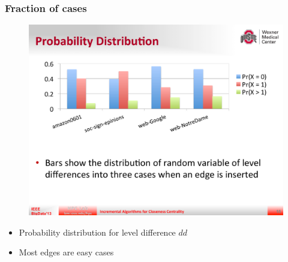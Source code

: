 \begin{frame}
  \frametitle{Fraction of cases}

  \begin{figure}[H]
    \centering
    \includegraphics[width=\textwidth, height=0.5\textheight, keepaspectratio]{imgs/sksc-results1}
  \end{figure}

  \begin{itemize}
    \item Probability distribution for level difference $dd$
    \item Most edges are easy cases
  \end{itemize}
\end{frame}

